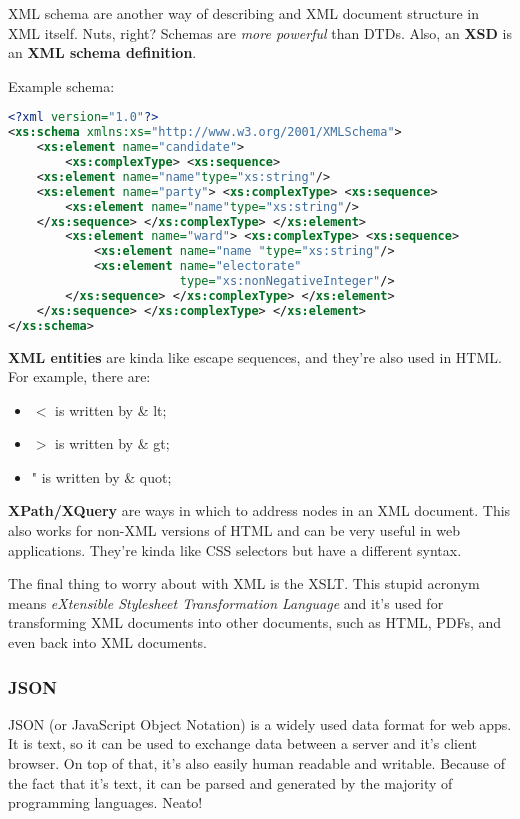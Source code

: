 \documentclass[11pt,a4paper,titlepage,dvipsnames,cmyk]{scrartcl}
\begin{document}
XML schema are another way of describing and XML document structure in XML
itself. Nuts, right? Schemas are \textit{more powerful} than DTDs. Also,
an \textbf{XSD} is an \textbf{XML schema definition}.

\begin{minipage}{\textwidth}
Example schema:
\begin{lstlisting}[language=XML]
<?xml version="1.0"?>
<xs:schema xmlns:xs="http://www.w3.org/2001/XMLSchema">
    <xs:element name="candidate">
        <xs:complexType> <xs:sequence>
    <xs:element name="name"type="xs:string"/>
    <xs:element name="party"> <xs:complexType> <xs:sequence>
        <xs:element name="name"type="xs:string"/>
    </xs:sequence> </xs:complexType> </xs:element>
        <xs:element name="ward"> <xs:complexType> <xs:sequence>
            <xs:element name="name "type="xs:string"/>
            <xs:element name="electorate"
                        type="xs:nonNegativeInteger"/>
        </xs:sequence> </xs:complexType> </xs:element>
    </xs:sequence> </xs:complexType> </xs:element>
</xs:schema>
\end{lstlisting}
\end{minipage}

\textbf{XML entities} are kinda like escape sequences, and they're also
used in HTML. For example, there are:
\begin{itemize}
    \item $<$ is written by \& lt;
    \item $>$ is written by \& gt;
    \item " is written by \& quot;
\end{itemize}

\textbf{XPath/XQuery} are ways in which to address nodes in an XML
document. This also works for non-XML versions of HTML and can be very
useful in web applications. They're kinda like CSS selectors but have a
different syntax.

The final thing to worry about with XML is the XSLT. This stupid acronym
means \textit{eXtensible Stylesheet Transformation Language} and it's used
for transforming XML documents into other documents, such as HTML, PDFs,
and even back into XML documents.

\subsubsection{JSON}%
\label{ssub:JSON}
JSON (or JavaScript Object Notation) is a widely used data format for web
apps. It is text, so it can be used to exchange data between a server and
it's client browser. On top of that, it's also easily human readable and
writable. Because of the fact that it's text, it can be parsed and
generated by the majority of programming languages. Neato!
\end{document}
